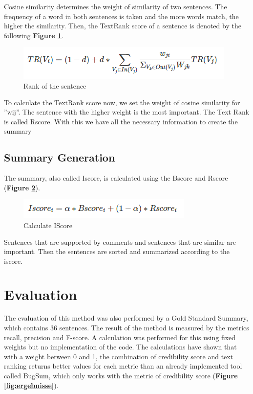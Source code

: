 \documentclass[a4paper,10pt, bibliography=totocnumbered]{scrreprt}
\begin{document}
Cosine similarity determines the weight of similarity of two sentences. The frequency of a word in both sentences is taken and the more words match, the higher the similarity. Then, the TextRank score of a sentence is denoted by the following \textbf{Figure \ref{fig:textrank1}}.

\begin{figure}
\centering
\includegraphics[scale=0.65]{../images/Thema10_textrank.PNG}
\caption{Rank of the sentence}
\label{fig:textrank1}
\end{figure}

To calculate the TextRank score now, we set the weight of cosine similarity for ''wij''. The sentence with the higher weight is the most important. The Text Rank is called Rscore. With this we have all the necessary information to create the summary

\subsection{Summary Generation}
The summary, also called Iscore, is calculated using the Bscore and Rscore (\textbf{Figure \ref{fig:iscore}}).

\begin{figure}
\centering
\includegraphics[scale=0.65]{../images/Thema10_iscore.PNG}
\caption{Calculate IScore}
\label{fig:iscore}
\end{figure}

Sentences that are supported by comments and sentences that are similar are important. Then the sentences are sorted and summarized according to the iscore.

\section{Evaluation}
The evaluation of this method was also performed by a Gold Standard Summary, which contains 36 sentences. The result of the method is measured by the metrics recall, precision and F-score. A calculation was performed for this using fixed weights but no implementation of the code. The calculations have shown that with a weight between 0 and 1, the combination of credibility score and text ranking returns better values for each metric than an already implemented tool called BugSum, which only works with the metric of credibility score (\textbf{Figure \ref{fig:ergebnisse}}). 
\end{document}
